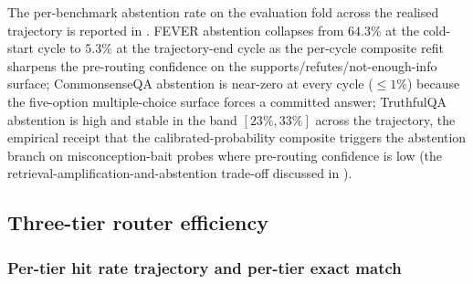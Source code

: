

The per-benchmark abstention rate on the evaluation fold across the realised trajectory is reported in . FEVER abstention collapses from $64.3\%$ at the cold-start cycle to $5.3\%$ at the trajectory-end cycle as the per-cycle composite refit sharpens the pre-routing confidence on the supports/refutes/not-enough-info surface; CommonsenseQA abstention is near-zero at every cycle ($\le 1\%$) because the five-option multiple-choice surface forces a committed answer; TruthfulQA abstention is high and stable in the band $[23\%, 33\%]$ across the trajectory, the empirical receipt that the calibrated-probability composite triggers the abstention branch on misconception-bait probes where pre-routing confidence is low (the retrieval-amplification-and-abstention trade-off discussed in ).



\FloatBarrier

\subsection{Three-tier router efficiency}
\label{sec:tier-efficiency}

\subsubsection{Per-tier hit rate trajectory and per-tier exact match}
\label{sec:tier-hit}

